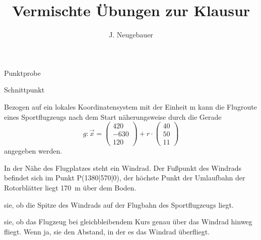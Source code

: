 \documentclass[11pt, a5paper, landscape]{scrartcl}
\author{J. Neugebauer}
\title{Vermischte Übungen zur Klausur}
\date{\Heute}
\begin{document}
\begin{aufgabe}
\end{aufgabe}
\clearpage

\begin{center}
	\begin{multicols}{2}
		Punktprobe \\
		\columnbreak
		
		Schnittpunkt \\
	\end{multicols}
\end{center}
\clearpage

\begin{aufgabe}
	Bezogen auf ein lokales Koordinatensystem mit der Einheit \si{\meter} kann die Flugroute eines Sportflugzeugs nach dem Start näherungsweise durch die Gerade
	\[ g: \vec{x} = \begin{pmatrix} 420 \\ -630 \\ 120 \end{pmatrix} + r\cdot \begin{pmatrix} 40 \\ 50 \\ 11 \end{pmatrix}\]
	angegeben werden.
	
	In der Nähe des Flugplatzes steht ein Windrad. Der Fußpunkt des Windrads befindet sich im Punkt P\pkt(1380|570|0), der höchste Punkt der Umlaufbahn der Rotorblätter liegt \SI{170}{\meter} über dem Boden.
	
	\begin{teilaufgaben}
		\teilaufgabe {} sie, ob die Spitze des Windrads auf der Flugbahn des Sportflugzeugs liegt.
	 
		\teilaufgabe {} sie, ob das Flugzeug bei gleichbleibendem Kurs genau über das Windrad hinweg fliegt. Wenn ja,  sie den Abstand, in der es das Windrad überfliegt.
	\end{teilaufgaben}
\end{aufgabe}
\clearpage
\end{document}

